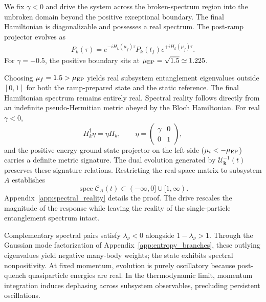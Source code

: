\documentclass[aps,prb,reprint,superscriptaddress,amsmath,amssymb,floatfix]{revtex4-2}
\begin{document}
We fix $\gamma<0$ and drive the system across the broken-spectrum region into the unbroken domain beyond the positive exceptional boundary. The final Hamiltonian is diagonalizable and possesses a real spectrum.
The post-ramp projector evolves as
\begin{equation}
\begin{aligned}
P_k(\tau) = e^{-iH_k(\mu_f)\tau} P_k(t_f) e^{+iH_k(\mu_f)\tau}.
\end{aligned} \label{eq:postramp_projector}
\end{equation}
For $\gamma=-0.5$, the positive boundary sits at $\mu_{\rm EP}=\sqrt{1.5}\simeq 1.225$.

Choosing $\mu_f=1.5>\mu_{\rm EP}$ yields real subsystem entanglement eigenvalues outside $[0,1]$ for both the ramp-prepared state and the static reference. The final Hamiltonian spectrum remains entirely real. Spectral reality follows directly from an indefinite pseudo-Hermitian metric obeyed by the Bloch Hamiltonian. For real $\gamma<0$,
\begin{equation}
H_k^\dagger\eta=\eta H_k, \qquad \eta= \begin{pmatrix} \gamma&0\\ 0&1 \end{pmatrix},
\label{eq:eta_pseudo_hermiticity}
\end{equation}
and the positive-energy ground-state projector on the left side ($\mu_i<-\mu_{\rm EP}$) carries a definite metric signature. The dual evolution generated by $\mathcal U_{\bm k}^{-1}(t)$ preserves these signature relations. Restricting the real-space matrix to subsystem $A$ establishes
\begin{equation}
\operatorname{spec}\mathcal C_A(t) \subset (-\infty,0]\cup[1,\infty).
\label{eq:CA_spectral_constraint}
\end{equation}
Appendix~\ref{app:spectral_reality} details the proof. The drive rescales the magnitude of the response while leaving the reality of the single-particle entanglement spectrum intact.

Complementary spectral pairs satisfy $\lambda_\nu<0$ alongside $1-\lambda_\nu>1$. Through the Gaussian mode factorization of Appendix~\ref{app:entropy_branches}, these outlying eigenvalues yield negative many-body weights; the state exhibits spectral nonpositivity. At fixed momentum, evolution is purely oscillatory because post-quench quasiparticle energies are real. In the thermodynamic limit, momentum integration induces dephasing across subsystem observables, precluding persistent oscillations.
\end{document}
